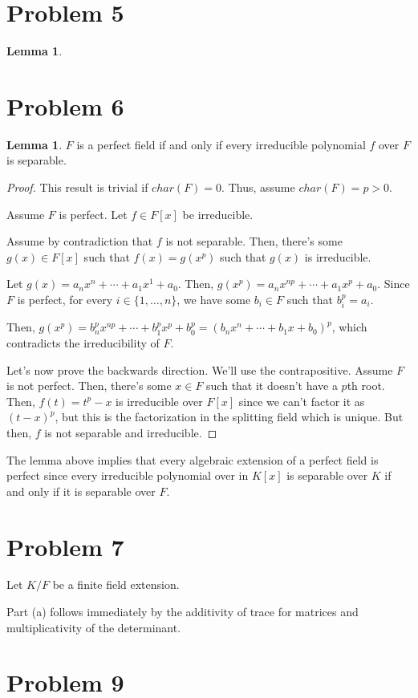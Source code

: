 \documentclass{article}
\theoremstyle{definition}
\newtheorem{lemma}[theorem]{Lemma}
\begin{document}
\section{Problem 5}

\begin{lemma}
    
\end{lemma}

\section{Problem 6}

\begin{lemma}
    $ F $ is a perfect field if and only if every irreducible polynomial $ f $ over $ F $ is separable.
\end{lemma}
\begin{proof}
    This result is trivial if $ char(F) = 0 $. Thus, assume $ char(F) = p > 0 $.
    
    Assume $ F $ is perfect. Let $ f \in F[x] $ be irreducible.

    Assume by contradiction that $ f $ is not separable. Then, there's some $ g(x) \in F[x] $
    such that $ f(x) = g(x^{p}) $ such that $ g(x) $ is irreducible.

    Let $ g(x) = a_{n}x^{n} + \cdots + a_{1}x^{1} + a_{0} $.
    Then, $ g(x^{p}) = a_{n}x^{np} + \cdots + a_{1}x^{p} + a_{0} $.
    Since $ F $ is perfect, for every $ i \in \{1,\ldots, n \} $, we have some $ b_{i} \in F $
    such that $ b_{i}^{p} = a_{i} $.

    Then, $ g(x^{p}) = b_{n}^{p}x^{np} + \cdots + b_{1}^{p}x^{p} + b_{0}^{p}  = (b_{n}x^{n} + \cdots + b_{1}x + b_{0})^{p} $,
    which contradicts the irreducibility of $ F $.

    Let's now prove the backwards direction. We'll use the contrapositive.
    Assume $ F $ is not perfect. Then, there's some $ x \in F $ such that
    it doesn't have a $ p $th root. Then, $ f(t) = t^{p} - x $ is irreducible
    over $ F[x] $ since we can't factor it as $ (t - x)^{p} $, but this is the factorization
    in the splitting field which is unique. But then, $ f $ is not separable and irreducible.
\end{proof}

The lemma above implies that every algebraic extension of a perfect field is perfect since
every irreducible polynomial over in $ K[x] $ is separable over $ K $ if and only
if it is separable over $ F $.

\section{Problem 7}

Let $ K/F $ be a finite field extension.

Part (a) follows immediately by the additivity of trace for matrices and multiplicativity of
the determinant.

\section{Problem 9}
\end{document}
